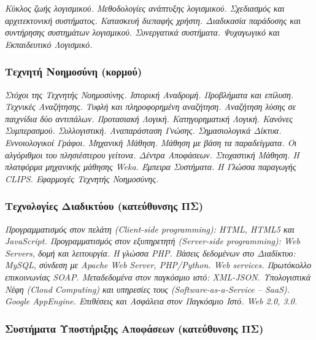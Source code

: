 \emph{Κύκλος ζωής λογισμικού. Μεθοδολογίες ανάπτυξης λογισμικού.
Σχεδιασμός και αρχιτεκτονική συστήματος. Κατασκευή διεπαφής χρήστη.
Διαδικασία παράδοσης και συντήρησης συστημάτων λογισμικού. Συνεργατικά
συστήματα. Ψυχαγωγικό και Εκπαιδευτικό Λογισμικό.}

\hypertarget{ux3c4ux3b5ux3c7ux3bdux3b7ux3c4ux3ae-ux3bdux3bfux3b7ux3bcux3bfux3c3ux3cdux3bdux3b7-ux3baux3bfux3c1ux3bcux3bfux3cd}{%
\subsubsection{Τεχνητή Νοημοσύνη
(κορμού)}\label{ux3c4ux3b5ux3c7ux3bdux3b7ux3c4ux3ae-ux3bdux3bfux3b7ux3bcux3bfux3c3ux3cdux3bdux3b7-ux3baux3bfux3c1ux3bcux3bfux3cd}}

\emph{Στόχοι της Τεχνητής Νοημοσύνης. Ιστορική Αναδρομή. Προβλήματα και
επίλυση. Τεχνικές Αναζήτησης. Τυφλή και πληροφορημένη αναζήτηση.
Αναζήτηση λύσης σε παιχνίδια δύο αντιπάλων. Προτασιακή Λογική.
Κατηγορηματική Λογική. Κανόνες Συμπερασμού. Συλλογιστική. Αναπαράσταση
Γνώσης. Σημασιολογικά Δίκτυα. Εννοιολογικοί Γράφοι. Μηχανική Μάθηση.
Μάθηση με βάση τα παραδείγματα. Οι αλγόριθμοι του πλησιέστερου γείτονα.
Δέντρα Αποφάσεων. Στοχαστική Μάθηση. Η πλατφόρμα μηχανικής μάθησης Weka.
Έμπειρα Συστήματα. Η Γλώσσα παραγωγής CLIPS. Εφαρμογές Τεχνητής
Νοημοσύνης.}

\hypertarget{ux3c4ux3b5ux3c7ux3bdux3bfux3bbux3bfux3b3ux3afux3b5ux3c2-ux3b4ux3b9ux3b1ux3b4ux3b9ux3baux3c4ux3cdux3bfux3c5-ux3baux3b1ux3c4ux3b5ux3cdux3b8ux3c5ux3bdux3c3ux3b7ux3c2-ux3c0ux3c3}{%
\subsubsection{Τεχνολογίες Διαδικτύου (κατεύθυνσης
ΠΣ)}\label{ux3c4ux3b5ux3c7ux3bdux3bfux3bbux3bfux3b3ux3afux3b5ux3c2-ux3b4ux3b9ux3b1ux3b4ux3b9ux3baux3c4ux3cdux3bfux3c5-ux3baux3b1ux3c4ux3b5ux3cdux3b8ux3c5ux3bdux3c3ux3b7ux3c2-ux3c0ux3c3}}

\emph{Προγραμματισμός στον πελάτη (Client-side programming): HTML, HTML5
και JavaScript. Προγραμματισμός στον εξυπηρετητή (Server-side
programming): Web Servers, δομή και λειτουργία. Η γλώσσα PHP. Βάσεις
δεδομένων στο Διαδίκτυο: MySQL, σύνδεση με Apache Web Server,
PHP/Python. Web services. Πρωτόκολλο επικοινωνίας SOAP. Μεταδεδομένα
στον παγκόσμιο ιστό: XML-JSON. Υπολογιστικά Νέφη (Cloud Computing) και
υπηρεσίες τους (Software-as-a-Service -- SaaS). Google AppEngine.
Επιθέσεις και Ασφάλεια στον Παγκόσμιο Ιστό. Web 2.0, 3.0.}

\hypertarget{ux3c3ux3c5ux3c3ux3c4ux3aeux3bcux3b1ux3c4ux3b1-ux3c5ux3c0ux3bfux3c3ux3c4ux3aeux3c1ux3b9ux3beux3b7ux3c2-ux3b1ux3c0ux3bfux3c6ux3acux3c3ux3b5ux3c9ux3bd-ux3baux3b1ux3c4ux3b5ux3cdux3b8ux3c5ux3bdux3c3ux3b7ux3c2-ux3c0ux3c3}{%
\subsubsection{Συστήματα Υποστήριξης Αποφάσεων (κατεύθυνσης
ΠΣ)}\label{ux3c3ux3c5ux3c3ux3c4ux3aeux3bcux3b1ux3c4ux3b1-ux3c5ux3c0ux3bfux3c3ux3c4ux3aeux3c1ux3b9ux3beux3b7ux3c2-ux3b1ux3c0ux3bfux3c6ux3acux3c3ux3b5ux3c9ux3bd-ux3baux3b1ux3c4ux3b5ux3cdux3b8ux3c5ux3bdux3c3ux3b7ux3c2-ux3c0ux3c3}}


